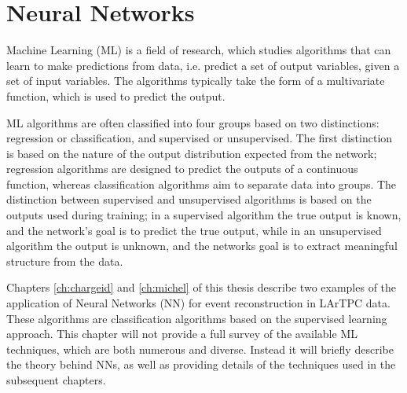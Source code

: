 \chapter{\label{ch:ml}Neural Networks} 

\minitoc

Machine Learning (ML) is a field of research, which studies algorithms that
can learn to make predictions from data, i.e. predict a set of output variables,
given a set of input variables. The algorithms typically take the form of a
multivariate function, which is used to predict the output\cite{Reed1999}.

ML algorithms are often classified into four groups based on two distinctions: 
regression or classification, and supervised or unsupervised. The first
distinction is based on the nature of the output distribution expected from the
network; regression algorithms are designed to predict the outputs of a 
continuous function, whereas classification algorithms aim to separate data 
into groups. The distinction between supervised and unsupervised algorithms is 
based on the outputs used during training; in a supervised algorithm the true 
output is known, and the network's goal is to predict the true output, while 
in an unsupervised algorithm the output is unknown, and the networks goal is 
to extract meaningful structure from the data\cite{Lecun2015}.

Chapters \ref{ch:chargeid} and \ref{ch:michel} of this thesis describe two 
examples of the application of Neural Networks (NN) for event reconstruction 
in LArTPC data. These algorithms are classification algorithms based on the
supervised learning approach. This chapter will not provide a full survey of
the available ML techniques, which are both numerous and diverse. Instead it 
will briefly describe the theory behind NNs, as well as providing details of 
the techniques used in the subsequent chapters. 

